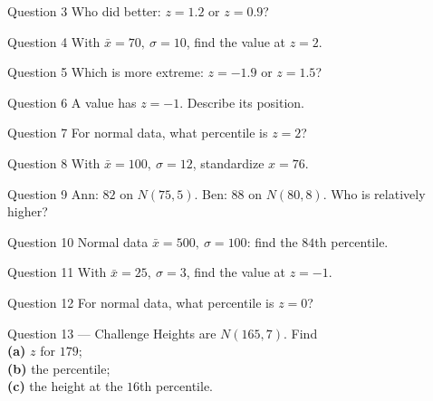 \documentclass[11pt]{article}
\begin{document}
\begin{qbox}{Question 3}
Who did better: $z=1.2$ or $z=0.9$?\workspace{2.4cm}
\end{qbox}

\begin{qbox}{Question 4}
With $\bar x=70,\ \sigma=10$, find the value at $z=2$.\workspace{2.4cm}
\end{qbox}

\begin{qbox}{Question 5}
Which is more extreme: $z=-1.9$ or $z=1.5$?\workspace{2.4cm}
\end{qbox}

\begin{qbox}{Question 6}
A value has $z=-1$. Describe its position.\workspace{2.4cm}
\end{qbox}

\begin{qbox}{Question 7}
For normal data, what percentile is $z=2$?\workspace{2.4cm}
\end{qbox}

\begin{qbox}{Question 8}
With $\bar x=100,\ \sigma=12$, standardize $x=76$.\workspace{2.4cm}
\end{qbox}

\begin{qbox}{Question 9}
Ann: $82$ on $N(75,5)$. Ben: $88$ on $N(80,8)$. Who is relatively higher?\workspace{2.4cm}
\end{qbox}

\begin{qbox}{Question 10}
Normal data $\bar x=500,\ \sigma=100$: find the $84$th percentile.\workspace{2.4cm}
\end{qbox}

\begin{qbox}{Question 11}
With $\bar x=25,\ \sigma=3$, find the value at $z=-1$.\workspace{2.4cm}
\end{qbox}

\begin{qbox}{Question 12}
For normal data, what percentile is $z=0$?\workspace{2.4cm}
\end{qbox}

\begin{qbox}{Question 13 --- Challenge}
Heights are $N(165,7)$. Find \\ \textbf{(a)} $z$ for $179$; \\ \textbf{(b)} the percentile; \\ \textbf{(c)} the height at the $16$th percentile.\workspace{3cm}
\end{qbox}
\end{document}
